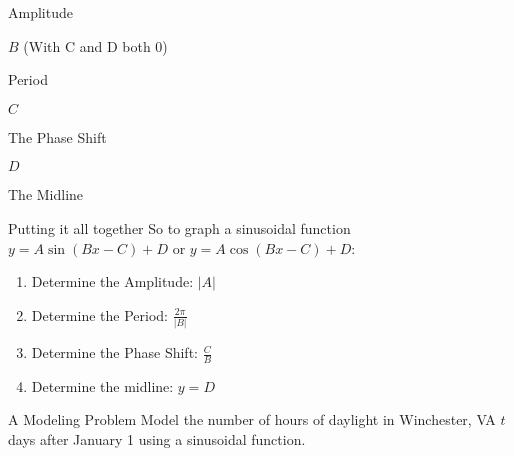 \documentclass[presentation]{beamer}
\begin{document}
\begin{frame}[label={sec:org8dd4c9b}]{Amplitude}
\end{frame}

\begin{frame}[label={sec:orgee14a70}]{\(B\) (With C and D both 0)}
\end{frame}

\begin{frame}[label={sec:org52c1dcd}]{Period}
\end{frame}

\begin{frame}[label={sec:org10d09fc}]{\(C\)}
\end{frame}

\begin{frame}[label={sec:org257121a}]{The Phase Shift}
\end{frame}

\begin{frame}[label={sec:org5349d29}]{\(D\)}
\end{frame}

\begin{frame}[label={sec:org71b181b}]{The Midline}
\end{frame}

\begin{frame}[label={sec:org6c1412c}]{Putting it all together}
So to graph a sinusoidal function \(y = A\sin\left(Bx - C \right) + D\) or \(y = A\cos \left( Bx - C \right) + D\):

\begin{block}{}
\begin{enumerate}
\item Determine the Amplitude: \(\left| A \right|\)
\item Determine the Period: \(\frac{2\pi}{|B|}\)
\item Determine the Phase Shift: \(\frac{C}{B}\)
\item Determine the midline: \(y = D\)
\end{enumerate}
\end{block}
\end{frame}

\begin{frame}[label={sec:org74fc964}]{A Modeling Problem}
Model the number of hours of daylight in Winchester, VA \(t\) days
after January 1 using a sinusoidal function.

\vspace{10in}
\end{frame}
\end{document}
